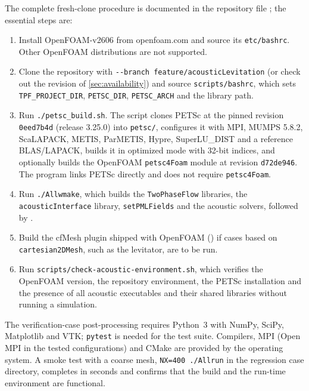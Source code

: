 \documentclass[final,12pt,nopreprintline]{elsarticle}
\newcommand{\code}[1]{\texttt{#1}}
\begin{document}
The complete fresh-clone procedure is documented in the repository file
; the essential steps are:
\begin{enumerate}[leftmargin=*]
    \item Install OpenFOAM-v2606 from openfoam.com and source its
    \code{etc/bashrc}.  Other OpenFOAM distributions are not supported.
    \item Clone the repository with \code{-{}-branch feature/acousticLevitation}
    (or check out the revision of \cref{sec:availability}) and source
    \code{scripts/bashrc},
    which sets \code{TPF\_PROJECT\_DIR}, \code{PETSC\_DIR}, \code{PETSC\_ARCH}
    and the library path.
    \item Run \code{./petsc\_build.sh}.  The script clones PETSc at the pinned
    revision \code{0eed7b4d} (release 3.25.0) into \code{petsc/}, configures
    it with MPI, MUMPS 5.8.2, ScaLAPACK, METIS, ParMETIS, Hypre, SuperLU\_DIST
    and a reference BLAS/LAPACK, builds it in optimized mode with 32-bit
    indices, and optionally builds the OpenFOAM \code{petsc4Foam} module at
    revision \code{d72de946}.  The program links PETSc directly and does not
    require \code{petsc4Foam}.
    \item Run \code{./Allwmake}, which builds the \code{TwoPhaseFlow}
    libraries, the \code{acousticInterface} library, \code{setPMLFields}
    and the acoustic solvers, followed by
    .
    \item Build the cfMesh plugin \cite{Juretic2015} shipped with OpenFOAM
    () if cases based on
    \code{cartesian2DMesh}, such as the levitator, are to be run.
    \item Run \code{scripts/check-acoustic-environment.sh}, which verifies the
    OpenFOAM version, the repository environment, the PETSc installation and
    the presence of all acoustic executables and their shared libraries
    without running a simulation.
\end{enumerate}
The verification-case post-processing requires Python~3 with NumPy, SciPy,
Matplotlib and VTK; \code{pytest} is needed for the test suite.  Compilers,
MPI (Open MPI \cite{Gabriel2004} in the tested configurations) and CMake are
provided by the operating system.  A smoke test with a coarse mesh,
\code{NX=400 ./Allrun} in the regression case directory, completes in seconds
and confirms that the build and the run-time environment are functional.
\end{document}
